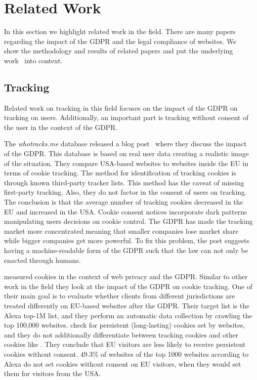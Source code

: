 \section{Related Work}
\label{sec:related}

In this section we highlight related work in the field. There are many papers regarding the impact of the GDPR and
the legal compliance of websites. We show the methodology and results of related papers and put the underlying
work~\cite{sanchez2019can} into context.

\subsection{Tracking}

Related work on tracking in this field focuses on the impact of the GDPR on tracking on users. Additionally, an important
part is tracking without consent of the user in the context of the GDPR.

The \emph{whotracks.me} database released a blog post~\cite{whathappened} where they discuss the impact of the GDPR.
This database is based on real user data creating a realistic image of the situation. They compare USA-based websites to
websites inside the EU in terms of cookie tracking. The method for identification of tracking cookies is through known third-party
tracker lists. This method has the caveat of missing first-party tracking. Also, they do not factor in the consent of
users on tracking. The conclusion is that the average number of tracking cookies decreased in the EU and increased in
the USA. Cookie consent notices incorporate dark patterns manipulating users decisions on cookie control. The GDPR has
made the tracking market more concentrated meaning that smaller companies lose market share while bigger companies get
more powerful. To fix this problem, the post suggests having a machine-readable form of the GDPR such that the law can
not only be enacted through humans.

 measured cookies in the context of web privacy and the GDPR. Similar to other work in the
field they look at the impact of the GDPR on cookie tracking. One of their main goal is to evaluate whether clients from
different jurisdictions are treated differently on EU-based websites after the GDPR. Their target list is the Alexa
top-1M list, and they perform an automatic data collection by crawling the top 100,000 websites.
\citeauthor{dabrowski2019measuring} check for persistent (long-lasting) cookies set by websites, and they do not
additionally differentiate between tracking cookies and other cookies like . They conclude that EU
visitors are less likely to receive persistent cookies without consent. 49.3\% of websites of the top 1000 websites
according to Alexa do not set cookies without consent on EU visitors, when they would set them for visitors from the USA.

